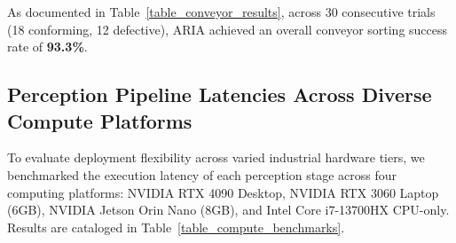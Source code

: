 \documentclass[journal]{IEEEtran}
\begin{document}
As documented in Table~\ref{table_conveyor_results}, across 30 consecutive trials (18 conforming, 12 defective), ARIA achieved an overall conveyor sorting success rate of \textbf{93.3\%}.

\subsection{Perception Pipeline Latencies Across Diverse Compute Platforms}
To evaluate deployment flexibility across varied industrial hardware tiers, we benchmarked the execution latency of each perception stage across four computing platforms: NVIDIA RTX 4090 Desktop, NVIDIA RTX 3060 Laptop (6GB), NVIDIA Jetson Orin Nano (8GB), and Intel Core i7-13700HX CPU-only. Results are cataloged in Table~\ref{table_compute_benchmarks}.

\begin{table}[!t]
\centering
\caption{Micro-Benchmark of Perception Pipeline Latencies Across Diverse Computing Platforms}
\label{table_compute_benchmarks}
\footnotesize
{}
\end{table}
\end{document}

